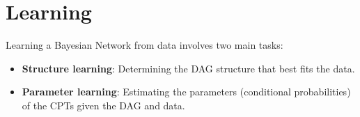 \section{Learning}

Learning a Bayesian Network from data involves two main tasks:

\begin{itemize}
    \item \textbf{Structure learning}: Determining the DAG structure that best fits the data.
    \item \textbf{Parameter learning}: Estimating the parameters (conditional probabilities) of the CPTs given the DAG and data.
\end{itemize}

\